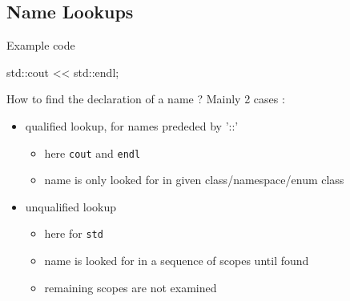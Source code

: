 \subsection[ADL]{Name Lookups}

\begin{frame}[fragile]
  \begin{exampleblock}{Example code}
    \begin{cppcode}
      std::cout << std::endl;
    \end{cppcode}
  \end{exampleblock}
  \begin{block}{How to find the declaration of a name ?}
    Mainly 2 cases :
    \begin{itemize}
    \item qualified lookup, for names prededed by '::'
      \begin{itemize}
      \item here \texttt{cout} and \texttt{endl}
      \item name is only looked for in given class/namespace/enum class
      \end{itemize}
    \item unqualified lookup
      \begin{itemize}
      \item here for \texttt{std}
      \item name is looked for in a sequence of scopes until found
      \item remaining scopes are not examined
      \end{itemize}
    \end{itemize}
  \end{block}
\end{frame}

